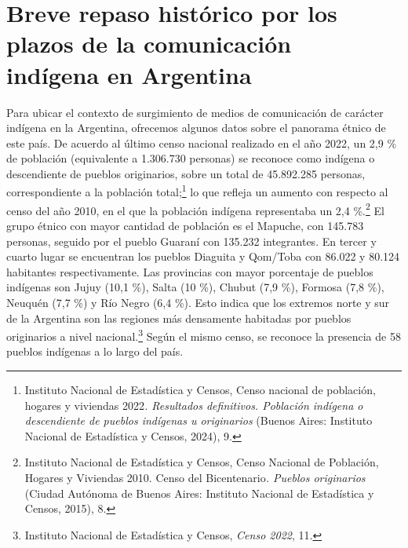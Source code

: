 \documentclass{tufte-handout}
\begin{document}
\hypertarget{breve-repaso-histrico-por-los-plazos-de-la-comunicacin-indgena-en-argentina}{%
\section{Breve repaso histórico por los plazos de la comunicación\\\noindent indígena en
Argentina}\label{breve-repaso-histrico-por-los-plazos-de-la-comunicacin-indgena-en-argentina}}

Para ubicar el contexto de surgimiento de medios de comunicación de
carácter indígena en la Argentina, ofrecemos algunos datos sobre el
panorama étnico de este país. De acuerdo al último censo nacional
realizado en el año 2022, un 2,9 \% de población (equivalente a
1.306.730 personas) se reconoce como indígena o descendiente de pueblos
originarios, sobre un total de 45.892.285 personas, correspondiente a la
población total;\footnote{Instituto Nacional de Estadística y Censos,
  Censo nacional de población, hogares y viviendas 2022\emph{.
  Resultados definitivos. Población indígena o descendiente de pueblos
  indígenas u originarios} (Buenos Aires: Instituto Nacional de
  Estadística y Censos, 2024), 9.} lo que refleja un aumento con
respecto al censo del año 2010, en el que la población indígena
representaba un 2,4 \%.\footnote{Instituto Nacional de Estadística y
  Censos, Censo Nacional de Población, Hogares y Viviendas 2010. Censo
  del Bicentenario\emph{. Pueblos originarios} (Ciudad Autónoma de
  Buenos Aires: Instituto Nacional de Estadística y Censos, 2015), 8.}
El grupo étnico con mayor cantidad de población es el Mapuche, con
145.783 personas, seguido por el pueblo Guaraní con 135.232 integrantes.
En tercer y cuarto lugar se encuentran los pueblos Diaguita y Qom/Toba
con 86.022 y 80.124 habitantes respectivamente. Las provincias con mayor
porcentaje de pueblos indígenas son Jujuy (10,1 \%), Salta (10 \%),
Chubut (7,9 \%), Formosa (7,8 \%), Neuquén (7,7 \%) y Río Negro (6,4
\%). Esto indica que los extremos norte y sur de la Argentina son las
regiones más densamente habitadas por pueblos originarios a nivel
nacional.\footnote{Instituto Nacional de Estadística y Censos,
  \emph{Censo 2022}, 11.} Según el mismo censo, se reconoce la presencia
de 58 pueblos indígenas a lo largo del país.
\end{document}

